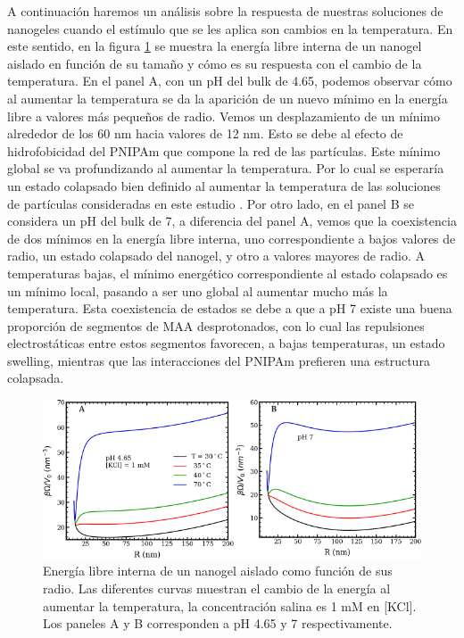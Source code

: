 	A continuaci\'on haremos un an\'alisis sobre la respuesta de nuestras soluciones de nanogeles cuando el est\'imulo que se les aplica son cambios en la temperatura. En este sentido, en la figura \ref{fig:mc:dfs_energy} se muestra la energ\'ia libre interna de un nanogel aislado en funci\'on de su tama\~no y c\'omo es su respuesta con el cambio de la temperatura. En el panel A, con un pH del bulk de 4.65, podemos observar c\'omo al aumentar la temperatura se da la aparici\'on de un nuevo m\'inimo en la energ\'ia libre a valores m\'as peque\~nos de radio. Vemos un desplazamiento de un m\'inimo alrededor de los 60 nm hacia valores de 12 nm. Esto se debe al efecto de hidrofobicidad del PNIPAm que compone la red de las part\'iculas. Este m\'inimo global se va profundizando al aumentar la temperatura. Por lo cual se esperar\'ia un estado colapsado bien definido al aumentar la temperatura de las soluciones de part\'iculas consideradas en este estudio . Por otro lado, en el panel B se considera un pH del bulk de 7, a diferencia del panel A, vemos que la coexistencia de dos m\'inimos en la energ\'ia libre interna, uno correspondiente a bajos valores de radio, un estado colapsado del nanogel, y otro a valores mayores de radio. A temperaturas bajas, el m\'inimo energ\'etico correspondiente al estado colapsado es un m\'inimo local, pasando a ser uno global al aumentar mucho m\'as la temperatura. Esta coexistencia de estados se debe a que a pH 7 existe una buena proporci\'on de segmentos de MAA desprotonados, con lo cual las repulsiones electrost\'aticas entre estos segmentos favorecen, a bajas temperaturas, un estado swelling, mientras que las interacciones del PNIPAm prefieren una estructura colapsada.%

	
	
	\begin{figure}[!htb]
		\centering
		\includegraphics[width=0.65\linewidth]{Figures/graph-mc/dfs_energy.pdf}
		\caption{Energ\'ia libre interna de un nanogel aislado como funci\'on de sus radio. Las diferentes curvas muestran el cambio de la energ\'ia al aumentar la temperatura, la concentraci\'on salina es 1 mM en [KCl]. Los paneles A y B corresponden a pH 4.65 y 7 respectivamente.}
		\label{fig:mc:dfs_energy}
	\end{figure}

